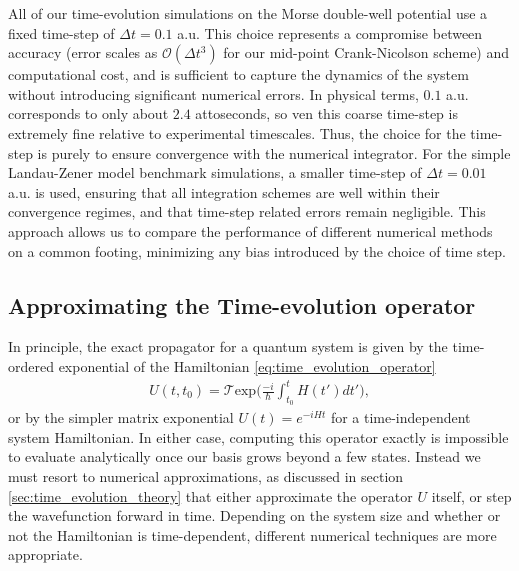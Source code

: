 \documentclass{subfiles}
\begin{document}
All of our time-evolution simulations on the Morse double-well potential use a fixed time-step of $\Delta t = 0.1$ a.u. This choice represents a compromise between accuracy (error scales as $\mathcal{O}(\Delta t^3)$ for our mid-point Crank-Nicolson scheme) and computational cost, and is sufficient to capture the dynamics of the system without introducing significant numerical errors. In physical terms, $0.1$ a.u. corresponds to only about $2.4$ attoseconds, so ven this coarse time-step is extremely fine relative to experimental timescales. Thus, the choice for the time-step is purely to ensure convergence with the numerical integrator. For the simple Landau-Zener model benchmark simulations, a smaller time-step of $\Delta t = 0.01$ a.u. is used, ensuring that all integration schemes are well within their convergence regimes, and that time-step related errors remain negligible. This approach allows us to compare the performance of different numerical methods on a common footing, minimizing any bias introduced by the choice of time step.

\subsection{Approximating the Time-evolution operator}\label{sec:time_evolution_operator}
In principle, the exact propagator for a quantum system is given by the time-ordered exponential of the Hamiltonian \eqref{eq:time_evolution_operator}
\begin{align*}
    U(t, t_0) = \mathcal{T}\text{exp}\bigg(\frac{-i}{\hbar}\int_{t_0}^t H(t')dt'\bigg),
\end{align*}
or by the simpler matrix exponential $U(t) = e^{-iHt}$ for a time-independent system Hamiltonian. In either case, computing this operator exactly is impossible to evaluate analytically once our basis grows beyond a few states. Instead we must resort to numerical approximations, as discussed in section \ref{sec:time_evolution_theory} that either approximate the operator $U$ itself, or step the wavefunction forward in time. Depending on the system size and whether or not the Hamiltonian is time-dependent, different numerical techniques are more appropriate. 
\end{document}
